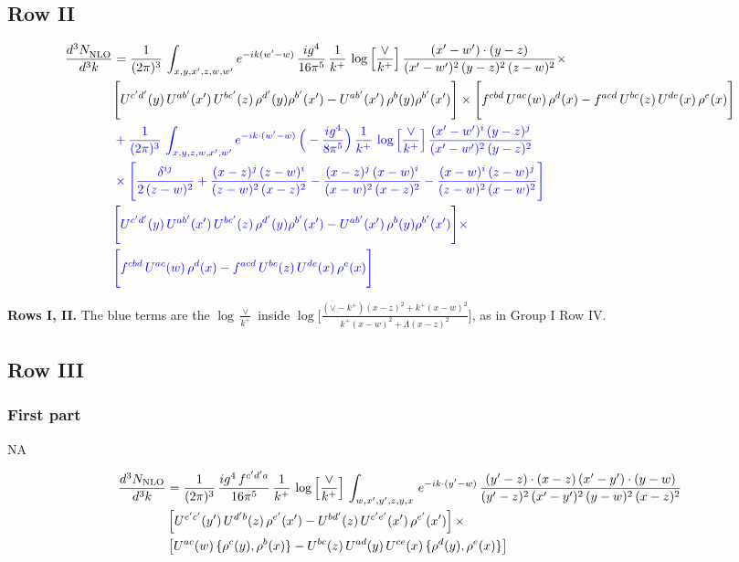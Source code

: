\documentclass[9pt]{article}
\newcommand{\old}[1]{{\color{red}#1}}
\newcommand{\new}[1]{{\color{blue}#1}}
\newcommand{\nc}{\color{blue}}
\numberwithin{equation}{section}
\begin{document}
\subsection{Row II}
\begin{align}
     \frac{d^{3}N_{\rm NLO}^{\rm}}{d^{3}k}  & =  \frac{1}{(2\pi)^{3}}\, \int_{x,y,x',z,w,w^{\prime}} e^{-ik(w^{\prime}-w)}\, \frac{ig^{4}}{16\pi^{5}}\,\frac{1}{k^{+}}\,\log{\left[\frac{\vee}{k^{+}}\right]}\, \frac{(x'-w')\cdot (y-z)}{(x'-w')^{2}\,(y-z)^{2}\,(z-w)^{2}}\times\,\notag \\ & \Bigg[U^{c'd'}(y)\,U^{ab'}(x')\,U^{bc'}(z)\,\rho^{d'}(y)\rho^{b'}(x')-U^{ab'}(x')\,\rho^{b}(y)\rho^{b'}(x')\Bigg]\times \Bigg[f^{cbd}\,U^{ac}(w)\,\rho^{d}(x)-f^{acd}\, U^{bc}(z)\,U^{de}(x)\,\rho^{e}(x)\Bigg]
\notag \\ & \nc +\frac{1}{(2\pi)^{3}}\,\int_{x,y,z,w,x',w'}e^{-ik\cdot (w^\prime-w)}\,\Big(-\frac{ig^{4}}{8\pi^{5}}\Big)\,\frac{1}{k^{+}}\,\log{\left[\frac{\vee}{k^{+}}\right]}\,\frac{(x'-w')^{i}\,(y-z)^{j}}{(x'-w')^{2}\,(y-z)^{2}}\notag \\ & \nc \times \Bigg[\frac{\delta^{ij}}{2\,(z-w)^{2}}+\frac{(x-z)^{j}\,(z-w)^{i}}{(z-w)^{2}\,(x-z)^{2}}-\frac{(x-z)^{j}\,(x-w)^{i}}{(x-w)^{2}\,(x-z)^{2}}-\frac{(x-w)^{i}\,(z-w)^{j}}{(z-w)^{2}\,(x-w)^{2}}\Bigg]\notag \\ & \nc \Bigg[U^{c'd'}(y)\,U^{ab'}(x')\,U^{bc'}(z)\,\rho^{d'}(y)\rho^{b'}(x')-U^{ab'}(x')\,\rho^{b}(y)\rho^{b'}(x')\Bigg]\times\notag \\ & \nc \Bigg[f^{cbd}\,U^{ac}(w)\,\rho^{d}(x)-f^{acd}\, U^{bc}(z)\,U^{de}(x)\,\rho^{e}(x)\Bigg]
\end{align}

\new{\textbf{Rows I, II.} The blue terms are the $\log\frac{\vee}{k^+}$ inside $\log\Big[\frac{(\vee-k^{+})(x-z)^{2}+k^{+}(x-w)^{2}}{k^{+}(x-w)^{2}+\Lambda(x-z)^{2}}\Big]$, as in Group I Row IV.}
 \subsection{Row III}
 \subsubsection{First part}
 \old{\textsc{NA}}

{\color{blue}
\begin{align}
\frac{d^{3}N_{\rm NLO}}{d^{3}k} & = \frac{1}{(2\pi)^{3}}\, \frac{ig^{4}\,f^{c'd'a}}{16\pi^{5}}\, \frac{1}{k^{+}}\,\log{\left[\frac{\vee}{k^{+}}\right]}\,\int_{w,x',y',z,y,x}\, e^{-ik\cdot (y'-w)}\,\frac{(y'-z)\cdot (x-z)\,(x'-y')\cdot (y-w)}{(y'-z)^{2}\,(x'-y')^{2}\,(y-w)^{2}\,(x-z)^{2}}\notag \\
& \left[U^{e'c'}(y')\,U^{d'b}(z)\,\rho^{e'}(x')-U^{bd'}(z)\,U^{c'e'}(x')\,\rho^{e'}(x')\right]\times\notag \\
& \left[U^{ac}(w)\, \{\rho^{c}(y),\rho^{b}(x)\}-U^{bc}(z)\,U^{ad}(y)\,U^{ce}(x)\,\{\rho^{d}(y),\rho^{e}(x)\}\right]
\end{align}}
\end{document}
